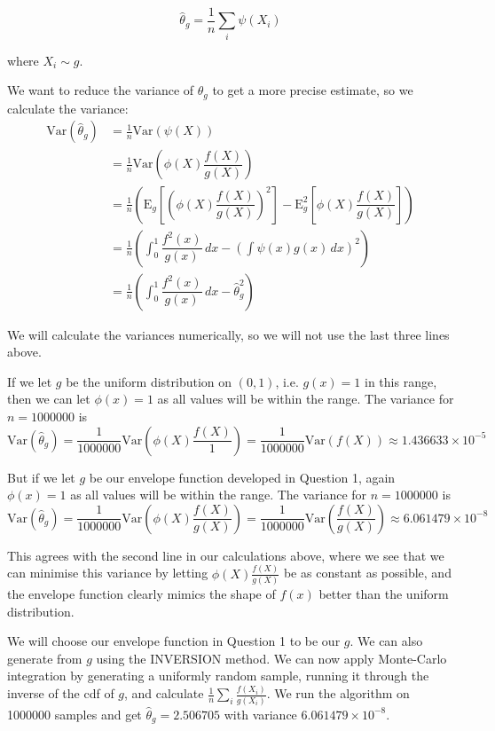\documentclass[11pt, a4paper]{article}
\newcommand{\E}{\mathrm{E}}
\newcommand{\Var}{\mathrm{Var}}
\begin{document}
$$ \hat{\theta}_g = \frac1{n} \sum_i \psi(X_i) $$

where $X_i \sim g$.

We want to reduce the variance of $\hat{\theta}_g$ to get a more precise estimate, so we calculate the variance:
\begin{align*}
 \Var(\hat{\theta}_g) &= \frac1{n}\Var(\psi(X))
\\ &= \frac1{n} \Var \left( \phi(X) \dfrac{f(X)}{g(X)} \right)
\\ &= \frac1{n} \left(\E_g \left[ \left( \phi(X) \dfrac{f(X)}{g(X)} \right)^2 \right] - \E_g^2\left[ \phi(X) \dfrac{f(X)}{g(X)} \right]  \right)
\\ &= \frac1{n} \left( \int_0^1 \dfrac{f^2(x)}{g(x)} \,dx - \left( \int \psi(x)g(x) \,dx \right) ^2 \right)
\\ &= \frac1{n}\left( \int_0^1 \dfrac{f^2(x)}{g(x)} \,dx - \hat{\theta}_g^2 \right)
\end{align*}

We will calculate the variances numerically, so we will not use the last three lines above.

If we let $g$ be the uniform distribution on $(0,1)$, i.e. $g(x) = 1$ in this range, then we can let $\phi(x) = 1$ as all values will be within the range. The variance for $n=1000000$ is
$$ \Var(\hat{\theta}_g) = \frac1{1000000} \Var \left( \phi(X) \dfrac{f(X)}{1} \right) = \frac1{1000000} \Var ( f(X) ) \approx 1.436633 \times 10^{-5} $$

But if we let $g$ be our envelope function developed in Question 1, again $\phi(x) = 1$ as all values will be within the range. The variance for $n=1000000$ is 
$$ \Var(\hat{\theta}_g) = \frac1{1000000} \Var \left( \phi(X) \dfrac{f(X)}{g(X)} \right) = \frac1{1000000} \Var \left( \dfrac{f(X)}{g(X)} \right) \approx 6.061479 \times 10^{-8} $$

This agrees with the second line in our calculations above, where we see that we can minimise this variance by letting $ \phi(X) \frac{f(X)}{g(X)} $ be as constant as possible, and the envelope function clearly mimics the shape of $f(x)$ better than the uniform distribution. 

We will choose our envelope function in Question 1 to be our $g$. We can also generate from $g$ using the INVERSION method. We can now apply Monte-Carlo integration by generating a uniformly random sample, running it through the inverse of the cdf of $g$, and calculate $\frac1{n} \sum_i \frac{f(X_i)}{g(X_i)}$. We run the algorithm on 1000000 samples and get $\hat{\theta}_g = 2.506705$ with variance $6.061479 \times 10^{-8}$.
\end{document}
